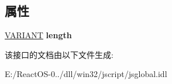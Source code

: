 \subsection*{属性}
\begin{DoxyCompactItemize}
\item 
\mbox{\label{interface_j_s_global_1_1_string_instance_a6602dd4fc164f7f3da36648b6f07016a}} 
\hyperlink{structtag_v_a_r_i_a_n_t}{V\+A\+R\+I\+A\+NT} {\bfseries length}
\end{DoxyCompactItemize}


该接口的文档由以下文件生成\+:\begin{DoxyCompactItemize}
\item 
E\+:/\+React\+O\+S-\/0../dll/win32/jscript/jsglobal.\+idl\end{DoxyCompactItemize}

